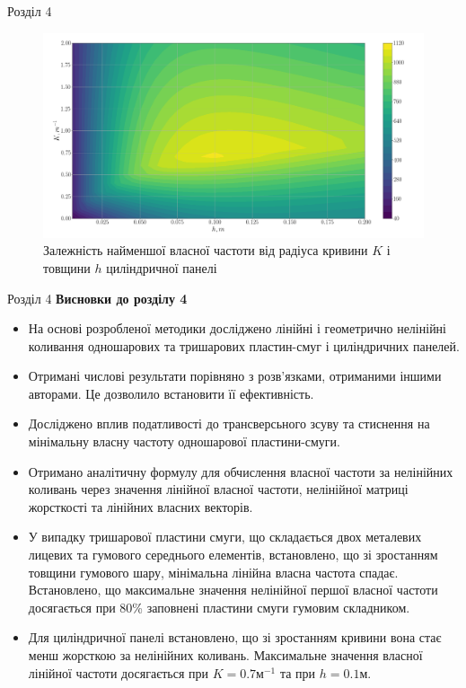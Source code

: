 \documentclass[8pt]{beamer}
\numberwithin{figure}{section}
\numberwithin{equation}{section}
\numberwithin{table}{section}
\begin{document}
\begin{frame}{Розділ 4}

\begin{figure}
	\includegraphics[scale=0.2]{pic/thickness_curvature_contour_plot2.png}
		\caption{Залежність найменшої власної частоти від радіуса кривини $K$ і товщини $h$ циліндричної панелі}
		\label{fig:omaga_K_h}
\end{figure}

\end{frame}

\begin{frame}{Розділ 4}
\textbf{Висновки до розділу 4}\\
\vspace{1em}
\begin{itemize}
\item На основі розробленої методики досліджено лінійні і геометрично нелінійні коливання одношарових та тришарових пластин-смуг і циліндричних панелей.
\item Отримані числові результати порівняно з розв'язками, отриманими іншими авторами. Це дозволило встановити її ефективність.
\item Досліджено вплив податливості до трансверсьного зсуву та стиснення на мінімальну власну частоту одношарової пластини-смуги.
\item Отримано аналітичну формулу для обчислення власної частоти за нелінійних коливань через значення лінійної власної частоти, нелінійної матриці жорсткості та лінійних власних векторів.
\item У випадку тришарової пластини смуги, що складається двох металевих лицевих та гумового середнього елементів, встановлено, що зі зростанням товщини гумового шару, мінімальна лінійна власна частота спадає. Встановлено, що максимальне значення нелінійної  першої власної частоти досягається при 80\% заповнені пластини смуги гумовим складником. 
\item Для циліндричної панелі встановлено, що зі зростанням кривини вона стає менш жорсткою за нелінійних коливань. Максимальне значення власної лінійної частоти досягається при $K=0.7 м^{-1}$ та при $h=0.1 м$.
\end{itemize}

\end{frame}
\end{document}

